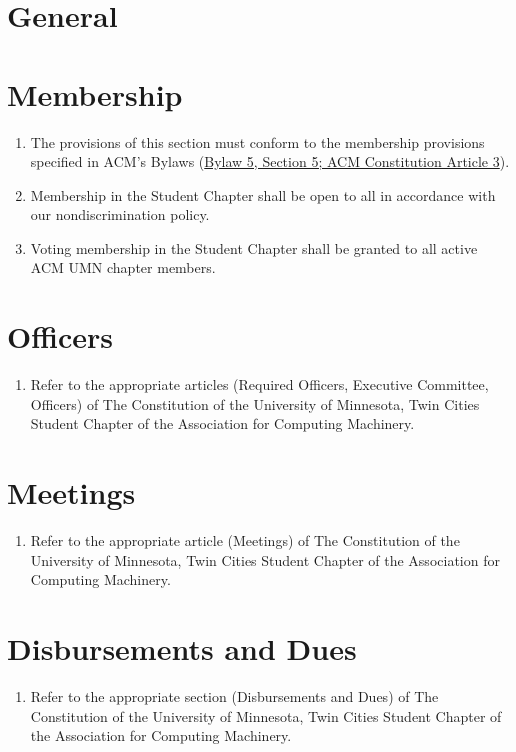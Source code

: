 



\section{General}



\section{Membership}
\begin{enumerate}
	\item The provisions of this section must conform to the membership provisions specified in ACM's Bylaws (\href{https://www.acm.org/governance/acm-bylaws#h-section-5.-membership.}{Bylaw 5, Section 5; ACM Constitution Article 3}).
	\item Membership in the Student Chapter shall be open to all in accordance with our nondiscrimination policy.
	\item Voting membership in the Student Chapter shall be granted to all active ACM UMN chapter members.
\end{enumerate}

\section{Officers}
\begin{enumerate}
	\item Refer to the appropriate articles (Required Officers, Executive Committee, Officers) of The Constitution of the University of Minnesota, Twin Cities Student Chapter of the Association for Computing Machinery.
\end{enumerate}

\section{Meetings}
\begin{enumerate}
	\item Refer to the appropriate article (Meetings) of The Constitution of the University of Minnesota, Twin Cities Student Chapter of the Association for Computing Machinery.
\end{enumerate}

\section{Disbursements and Dues}
\begin{enumerate}
	\item Refer to the appropriate section (Disbursements and Dues) of The Constitution of the University of Minnesota, Twin Cities Student Chapter of the Association for Computing Machinery.
\end{enumerate}

